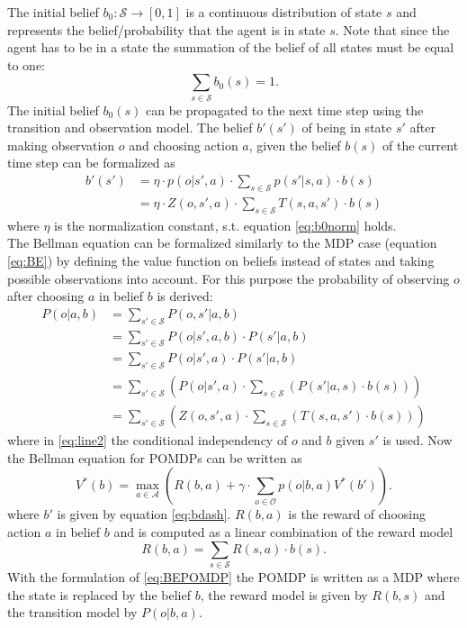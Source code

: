 The initial belief $b_0:\mathcal{S}\rightarrow [0, 1]$ is a continuous distribution of state $s$ and represents the belief/probability that the agent is in state $s$. Note that since the agent has to be in a state the summation of the belief of all states must be equal to one:
\begin{equation}\label{eq:b0norm}
    \sum_{s\in\mathcal{S}} b_0(s)=1.
\end{equation}
The initial belief $b_0(s)$ can be propagated to the next time step using the transition and observation model. The belief $b'(s')$ of being in state $s'$ after making observation $o$ and choosing action $a$, given the belief $b(s)$ of the current time step can be formalized as
\begin{align}\label{eq:bdash}
    b'(s') &= \eta \cdot p(o|s', a)\cdot \sum_{s\in\mathcal{S}}p(s'|s,a)\cdot b(s) \\
    &=\eta \cdot Z(o,s',a)\cdot \sum_{s\in\mathcal{S}}T(s,a,s')\cdot b(s)
\end{align}
where $\eta$ is the normalization constant, s.t. equation \ref{eq:b0norm} holds.\\
The Bellman equation can be formalized similarly to the MDP case (equation \ref{eq:BE}) by defining the value function on beliefs instead of states and taking possible observations into account. For this purpose the probability of observing $o$ after choosing $a$ in belief $b$ is derived:
\begin{align}
    P(o|a,b) &= \sum_{s'\in\mathcal{S}}P(o,s'|a,b)\\
    &= \sum_{s'\in\mathcal{S}}P(o|s', a,b)\cdot P(s'|a,b)\\
    &=\label{eq:line2} \sum_{s'\in\mathcal{S}}P(o|s', a)\cdot P(s'|a,b)\\
    &=\label{eq:line3}  \sum_{s'\in\mathcal{S}}\left(P(o|s', a)\cdot \sum_{s\in\mathcal{S}}\left(P(s'|a,s)\cdot b(s)\right)\right)\\
    &= \sum_{s'\in\mathcal{S}}\left(Z(o,s', a)\cdot \sum_{s\in\mathcal{S}}\left(T(s,a,s')\cdot b(s)\right)\right)
\end{align}
where in \ref{eq:line2} the conditional independency of $o$ and $b$ given $s'$ is used. Now the Bellman equation for POMDPs can be written as
\begin{equation}\label{eq:BEPOMDP}
    V^*(b) = \underset{a\in\mathcal{A}}{\max}\left( R(b,a) + \gamma\cdot \sum_{o\in\mathcal{O}} p(o|b,a)V^*(b') \right).
\end{equation}
where $b'$ is given by equation \ref{eq:bdash}. $R(b,a)$ is the reward of choosing action $a$ in belief $b$ and is computed as a linear combination of the reward model
\begin{equation}
    R(b,a) = \sum_{s\in\mathcal{S}}R(s,a)\cdot b(s).
\end{equation}
With the formulation of \ref{eq:BEPOMDP} the POMDP is written as a MDP where the state is replaced by the belief $b$, the reward model is given by $R(b,s)$ and the transition model by $P(o|b,a)$.\\

